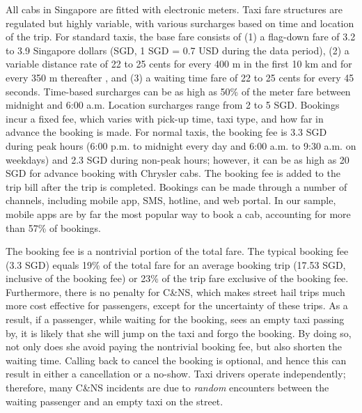 \documentclass[reviewmode]{restud}
\begin{document}
All cabs in Singapore are fitted with electronic meters. Taxi fare structures are regulated but highly variable,
with various surcharges based on time and location of the trip. For standard taxis, the base fare consists of (1) a flag-down fare of 3.2 to 3.9 Singapore dollars (SGD, 1 SGD = 0.7 USD during the data period), 
(2) a variable distance rate of 22 to 25 cents for every 400 m in the first 10 km and %
for every 350 m thereafter%
, and (3) a waiting time fare of 22 to 25 cents for every 45 seconds. Time-based surcharges can be as high as 50\% of the meter fare between midnight and 6:00 a.m. Location surcharges range from 2 to 5 SGD. Bookings incur a fixed fee, which varies with pick-up time, taxi type, and how far in advance the booking is made. For normal taxis, the booking fee is 3.3 SGD during peak hours (6:00 p.m. to midnight every day and 6:00 a.m. to 9:30 a.m. on weekdays) and 2.3 SGD during non-peak hours; however, it can be as high as 20 SGD for advance booking with Chrysler cabs. The booking fee is added to the trip bill after the trip is completed. Bookings can be made through a number of channels, including mobile app, SMS, hotline, and web portal. In our sample, mobile apps are by far the most popular way to book a cab, accounting for more than 57\% of bookings.

The booking fee is a nontrivial portion of the total fare. The typical booking fee (3.3 SGD) equals 19\% of the total fare for an average booking trip (17.53 SGD, inclusive of the booking fee) or 23\% of the trip fare exclusive of the booking fee. Furthermore, there is no penalty for C\&NS, which makes street hail trips much more cost effective for passengers, except for the uncertainty of these trips. As a result, if a passenger, while waiting for the booking, sees an empty taxi passing by, it is likely that she will jump on the taxi and forgo the booking. By doing so, not only does she avoid paying the nontrivial booking fee, but also shorten the waiting time. Calling back to cancel the booking is optional, and hence this can result in either a cancellation or a no-show. Taxi drivers operate independently; therefore, many C\&NS incidents are due to \textit{random} encounters between the waiting passenger and an empty taxi on the street.
\end{document}
